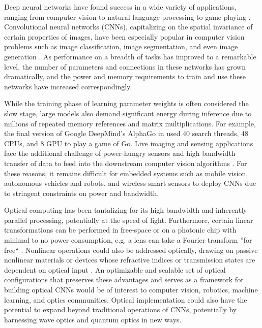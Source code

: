 Deep neural networks have found success in a wide variety of applications, ranging from computer vision to natural language processing to game playing \cite{lecun2015deep}. Convolutional neural networks (CNNs), capitalizing on the spatial invariance of certain properties of images, have been especially popular in computer vision problems such as image classification, image segmentation, and even image generation \cite{krizhevsky2012imagenet,goodfellow2014generative,long2015fully}. As performance on a breadth of tasks has improved to a remarkable level, the number of parameters and connections in these networks has grown dramatically, and the power and memory requirements to train and use these networks have increased correspondingly. 

While the training phase of learning parameter weights is often considered the slow stage, large models also demand significant energy during inference due to millions of repeated memory references and matrix multiplications. For example, the final version of Google DeepMind's AlphaGo in \cite{silver2016mastering} used 40 search threads, 48 CPUs, and 8 GPU to play a game of Go. Live imaging and sensing applications face the additional challenge of power-hungry sensors and high bandwidth transfer of data to feed into the downstream computer vision algorithms \cite{likamwa2013energy}. For these reasons, it remains difficult for embedded systems such as mobile vision, autonomous vehicles and robots, and wireless smart sensors to deploy CNNs due to stringent constraints on power and bandwidth. 

Optical computing has been tantalizing for its high bandwidth and inherently parallel processing, potentially at the speed of light. Furthermore, certain linear transformations can be performed in free-space or on a photonic chip with minimal to no power consumption, e.g. a lens can take a Fourier transform ''for free`` \cite{yang2013chip,goodman2008introduction}. Nonlinear operations could also be addressed optically, drawing on passive nonlinear materials or devices whose refractive indices or transmission states are dependent on optical input \cite{gibbs2012optical,christodoulides2010nonlinear}. An optimizable and scalable set of optical configurations that preserves these advantages and serves as a framework for building optical CNNs would be of interest to computer vision, robotics, machine learning, and optics communities. Optical implementation could also have the potential to expand beyond traditional operations of CNNs, potentially by harnessing wave optics and quantum optics in new ways. 

